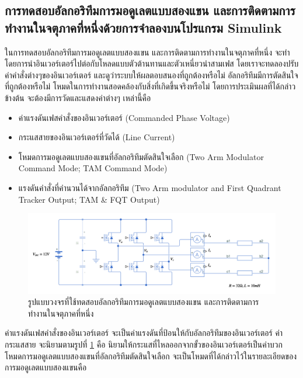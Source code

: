 \documentclass[11pt,a4paper]{article}
\begin{document}
\subsection{การทดสอบอัลกอริทึมการมอดูเลตแบบสองแขน และการติดตามการทำงานในจตุภาคที่หนึ่งด้วยการจำลองบนโปรแกรม Simulink}

ในการทดสอบอัลกอริทึมการมอดูเลตแบบสองแขน และการติดตามการทำงานในจตุภาคที่หนึ่ง จะทำโดยการนำอินเวอร์เตอร์ไปต่อกับโหลดแบบตัวต้านทานและตัวเหนี่ยวนำสามเฟส โดยเราจะทดลองปรับค่าคำสั่งต่างๆของอินเวอร์เตอร์ และดูว่าระบบให้ผลตอบสนองที่ถูกต้องหรือไม่ อัลกอริทึมมีการตัดสินใจที่ถูกต้องหรือไม่ โหมดในการทำงานสอดคล้องกับสิ่งที่เกิดขึ้นจริงหรือไม่ โดยการประเมินผลที่ได้กล่าวข้างต้น จะต้องมีการวัดและแสดงค่าต่างๆ เหล่านี้คือ

\begin{itemize}
    \item ค่าแรงดันเฟสคำสั่งของอินเวอร์เตอร์ (Commanded Phase Voltage)
    \item กระแสสายของอินเวอร์เตอร์ที่วัดได้ (Line Current)
    \item โหมดการมอดูเลตแบบสองแขนที่อัลกอริทึมตัดสินใจเลือก (Two Arm Modulator Command Mode; TAM Command Mode)
    \item แรงดันคำสั่งที่คำนวนได้จากอัลกอริทึม (Two Arm modulator and First Quadrant Tracker Output; TAM \& FQT Output)
\end{itemize}

\begin{figure}[H]
    \centering
    \includegraphics[width=\textwidth]{ildef.png}
    \caption{รูปแบบวงจรที่ใช้ทดสอบอัลกอริทึมการมอดูเลตแบบสองแขน และการติดตามการทำงานในจตุภาคที่หนึ่ง}
    \label{ildef}
\end{figure}

ค่าแรงดันเฟสคำสั่งของอินเวอร์เตอร์ จะเป็นค่าแรงดันที่ป้อนให้กับอัลกอริทึมของอินเวอร์เตอร์ \newline ค่ากระแสสาย จะนิยามตามรูปที่ \ref{ildef} คือ นิยามให้กระแสที่ไหลออกจากขั้วของอินเวอร์เตอร์เป็นค่าบวก \newline โหมดการมอดูเลตแบบสองแขนที่อัลกอริทึมตัดสินใจเลือก จะเป็นโหมดที่ได้กล่าวไว้ในรายละเอียดของการมอดูเลตแบบสองแขนคือ
\end{document}
